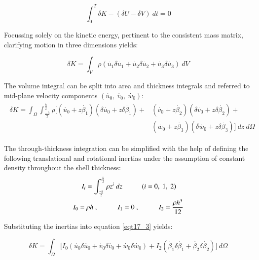 \begin{equation} 
\int_{0}^{T} \delta K - (\delta U - \delta V) \ dt = 0
\label{eqt17_1}
\end{equation}

Focussing solely on the kinetic energy, pertinent to the consistent mass matrix, clarifying motion in three dimensions yields:

\begin{equation} 
\delta K = \int_{V} \rho 
(
\dot{u_1} \delta \dot{u_1} + 
\dot{u_2} \delta \dot{u_2} + 
\dot{u_3} \delta \dot{u_3}
)
\ dV
\label{eqt17_2}
\end{equation}

The volume integral can be split into area and thickness integrals and referred to mid-plane velocity components $(\dot{u_0},\ \dot{v_0},\ \dot{w_0})$:
\begin{gather} 
	\begin{aligned}
		\delta K = \int_{\Omega} \int_{\frac{-h}{2}}^{\frac{h}{2}} \rho 
		\Big[
		(\dot{u_0} + z\dot{\beta_1})  (\delta \dot{u_0} + z\delta\dot{\beta_1})+ 
		&(\dot{v_0} + z\dot{\beta_2})  (\delta \dot{v_0} + z\delta\dot{\beta_2})+
		\\
		&(\dot{w_0} + z\dot{\beta_3})  (\delta \dot{w_0} + z\delta\dot{\beta_3})
		\Big]
		\ dz
		\ d\Omega
		\label{eqt17_3}
	\end{aligned}
\end{gather}

The through-thickness integration can be simplified with the help of defining the following translational and rotational inertias under the assumption of constant density throughout the shell thickness:
\begin{gather} 
	\begin{aligned}
		&\ \ \ \ \ 
		I_i = \int_{\frac{-h}{2}}^{\frac{h}{2}} \rho 
		z^i
		\ dz
		\hspace{10mm}
		(i = 0,\ 1,\ 2)
		\\
		&I_0 = \rho h\ ,
		\hspace{10mm}
		I_1 = 0\ ,
		\hspace{10mm}
		I_2 = \frac{\rho h^3}{12}
		\label{eqt17_4}
	\end{aligned}
\end{gather}

Substituting the inertias into equation \ref{eqt17_3} yields:

\begin{equation} 
	\delta K = \int_{\Omega} 
	\Big[I_0
	(\dot{u_0} \delta \dot{u_0} 
	+ \dot{v_0} \delta \dot{v_0}
	+ \dot{w_0} \delta \dot{w_0}
	)  
	+
	I_2
	(\dot{\beta_1} \delta \dot{\beta_1} 
	+ \dot{\beta_2} \delta \dot{\beta_2} 
	)  
	\Big]
	\ d\Omega
	\label{eqt17_5}
\end{equation}

